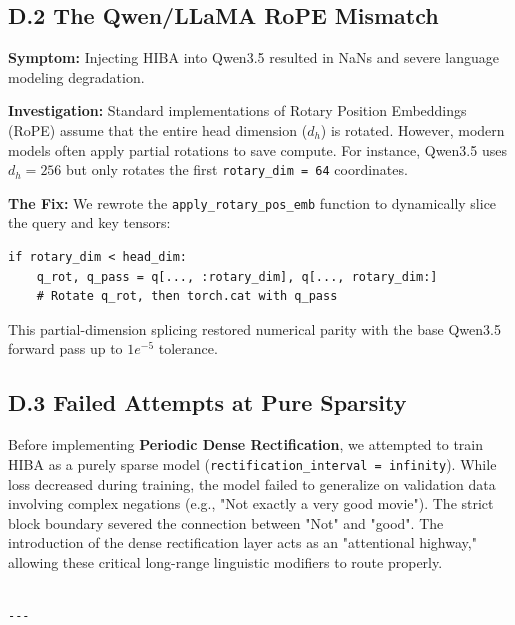\subsection{D.2 The Qwen/LLaMA RoPE Mismatch}

\textbf{Symptom:} Injecting HIBA into Qwen3.5 resulted in NaNs and severe language modeling degradation.

\textbf{Investigation:}
Standard implementations of Rotary Position Embeddings (RoPE) assume that the entire head dimension ($d_h$) is rotated. However, modern models often apply partial rotations to save compute. For instance, Qwen3.5 uses $d_h = 256$ but only rotates the first \texttt{rotary\_dim = 64} coordinates.

\textbf{The Fix:}
We rewrote the \texttt{apply\_rotary\_pos\_emb} function to dynamically slice the query and key tensors:

\begin{lstlisting}
if rotary_dim < head_dim:
    q_rot, q_pass = q[..., :rotary_dim], q[..., rotary_dim:]
    # Rotate q_rot, then torch.cat with q_pass

\end{lstlisting}

This partial-dimension splicing restored numerical parity with the base Qwen3.5 forward pass up to $1e^{-5}$ tolerance.

\subsection{D.3 Failed Attempts at Pure Sparsity}

Before implementing \textbf{Periodic Dense Rectification}, we attempted to train HIBA as a purely sparse model (\texttt{rectification\_interval = infinity}). While loss decreased during training, the model failed to generalize on validation data involving complex negations (e.g., "Not exactly a very good movie"). The strict block boundary severed the connection between "Not" and "good". The introduction of the dense rectification layer acts as an "attentional highway," allowing these critical long-range linguistic modifiers to route properly.

\begin{lstlisting}

---
\end{lstlisting}